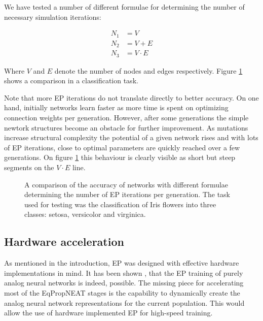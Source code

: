 \documentclass[lettersize,journal]{IEEEtran}
\newcommand{\eqprop}{EP }
\begin{document}
		We have tested a number of different formulae for determining the number of necessary simulation iterations:
		
		\begin{align}
			N_1 &= V\\
			N_2 &= V+E\\
			N_3 &= V\cdot E
		\end{align}
		
		Where $V$ and $E$ denote the number of nodes and edges respectively. Figure \ref{fig:network_com_iter} shows a comparison in a classification task. 
  
  Note that more \eqprop iterations do not translate directly to better accuracy. On one hand, initially networks learn faster as more time is spent on optimizing connection weights per generation. However, after some generations the simple newtork structures become an obstacle for further improvement. As mutations increase structural complexity the potential of a given network rises and with lots of \eqprop iterations, close to optimal parameters are quickly reached over a few generations. On figure \ref{fig:network_com_iter} this behaviour is clearly visible as short but steep segments on the $V\cdot E$ line.

          \begin{figure}
              \centering
              
              \caption{A comparison of the accuracy of networks with different formulae determining the number of \eqprop iterations per generation. The task used for testing was the classification of Iris flowers into three classes: setosa, versicolor and virginica. }
              \label{fig:network_com_iter}
          \end{figure}
        
  
		\subsection{Hardware acceleration}
		As mentioned in the introduction, \eqprop was designed with effective hardware implementations in mind. It has been shown \cite{hardware_eq}, that the \eqprop training of purely analog neural networks is indeed, possible. The missing piece for accelerating most of the EqPropNEAT stages is the capability to dynamically create the analog neural network representations for the current population. This would allow the use of hardware implemented \eqprop for high-speed training. 
		
\end{document}
